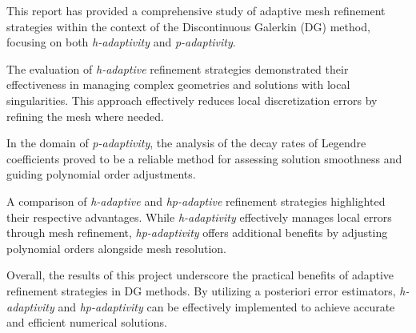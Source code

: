 This report has provided a comprehensive study of adaptive mesh refinement strategies within the context of the Discontinuous Galerkin (DG) method, focusing on both \textit{h-adaptivity} and \textit{p-adaptivity}.

The evaluation of \textit{h-adaptive} refinement strategies demonstrated their effectiveness in managing complex geometries and solutions with local singularities. This approach effectively reduces local discretization errors by refining the mesh where needed.

In the domain of \textit{p-adaptivity}, the analysis of the decay rates of Legendre coefficients proved to be a reliable method for assessing solution smoothness and guiding polynomial order adjustments.

A comparison of \textit{h-adaptive} and \textit{hp-adaptive} refinement strategies highlighted their respective advantages. While \textit{h-adaptivity} effectively manages local errors through mesh refinement, \textit{hp-adaptivity} offers additional benefits by adjusting polynomial orders alongside mesh resolution.

Overall, the results of this project underscore the practical benefits of adaptive refinement strategies in DG methods. By utilizing a posteriori error estimators, \textit{h-adaptivity} and \textit{hp-adaptivity} can be effectively implemented to achieve accurate and efficient numerical solutions.
